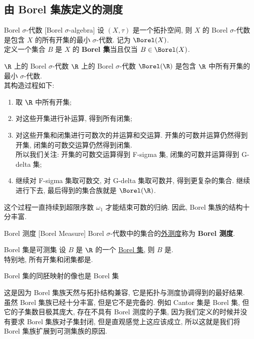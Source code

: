 \subsection{由 Borel 集族定义的测度}
\begin{xmp}
    [borel]
    {Borel \(\sigma\)-代数}
    [Borel \(\sigma\)-algebra]
    设 \((X,\tau)\) 是一个拓扑空间, 则 \(X\) 的 Borel \(\sigma\)-代数是包含 \(X\) 的所有开集的最小 \(\sigma\)-代数. 记为 \(\Borel(X)\).\\
    定义一个集合 \(B\) 是 \(X\) 的 \textbf{Borel 集}当且仅当 \(B\in\Borel(X)\).
\end{xmp}
\begin{ins}
    {\(\R\) 上的 Borel \(\sigma\)-代数}
    \(\R\) 上的 Borel \(\sigma\)-代数 \(\Borel(\R)\) 是包含 \(\R\) 中所有开集的最小 \(\sigma\)-代数. \\
    其构造过程如下:
    \begin{enumerate}[label=(\roman*)]
        \item 取 \(\R\) 中所有开集;
        \item 对这些开集进行补运算, 得到所有闭集;
        \item 对这些开集和闭集进行可数次的并运算和交运算. 开集的可数并运算仍然得到开集, 闭集的可数交运算仍然得到闭集. \\
            所以我们关注: 开集的可数交运算得到 F-sigma 集, 闭集的可数并运算得到 G-delta 集;
        \item 继续对 F-sigma 集取可数交, 对 G-delta 集取可数并, 得到更复杂的集合. 继续进行下去, 最后得到的集合族就是 \(\Borel(\R)\).
    \end{enumerate}
    这个过程一直持续到超限序数 \(\omega_1\) 才能结束可数的归纳. 因此, Borel 集族的结构十分丰富.
\end{ins}
\begin{dfn}
    {Borel 测度}
    [Borel Measure]
    Borel \(\sigma\)-代数中的集合的\hyperref[dfn:lebesgue-outer-measure]{外测度}称为 \textbf{Borel 测度}.
\end{dfn}
\begin{ppt}
    {Borel 集是可测集}
    设 \(B\) 是 \(\R\) 的一个 \hyperref[xmp:borel]{Borel 集}, 则 \(B\) 是\MeasurableSet{}.\\
    特别地, 所有开集和闭集都是\MeasurableSet{}.
\end{ppt}
\begin{ppt}
    {Borel 集的同胚映射的像也是 Borel 集}
\end{ppt}
\begin{rmk}
    [Dedicatia]
    这是因为 Borel 集族天然与拓扑结构兼容, 它是拓扑与测度协调得到的最好结果. 
    \tcbline
    虽然 Borel 集族已经十分丰富, 但是它不是完备的. 例如 Cantor 集是 Borel 集, 但它的子集数目极其庞大, 存在不具有 Borel 测度的子集, 因为我们定义的时候并没有要求 Borel 集族对子集封闭, 但是直观感觉上这应该成立, 所以这就是我们将 Borel 集族扩展到可测集族的原因.
\end{rmk}
